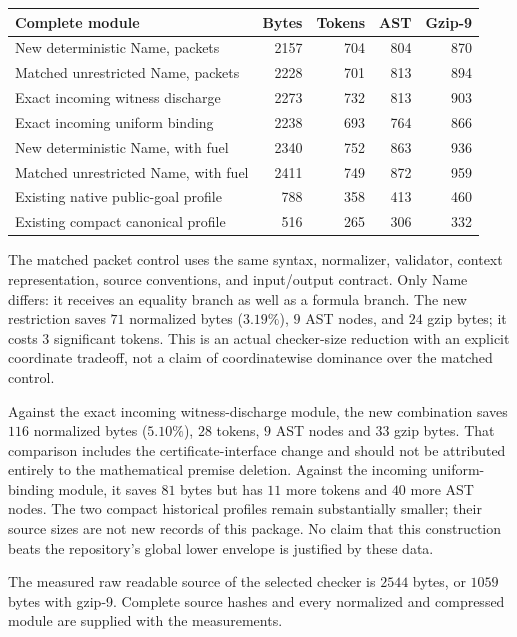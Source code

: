 \documentclass[11pt,a4paper]{article}
\theoremstyle{definition}\newtheorem{definition}[theorem]{Definition}
\theoremstyle{remark}\newtheorem{remark}[theorem]{Remark}
\begin{document}
\begin{center}
\small
\begin{tabular}{@{}lrrrr@{}}
\toprule
Complete module & Bytes & Tokens & AST & Gzip-9 \\
\midrule
New deterministic Name, packets & 2157 & 704 & 804 & 870 \\
Matched unrestricted Name, packets & 2228 & 701 & 813 & 894 \\
Exact incoming witness discharge & 2273 & 732 & 813 & 903 \\
Exact incoming uniform binding & 2238 & 693 & 764 & 866 \\
New deterministic Name, with fuel & 2340 & 752 & 863 & 936 \\
Matched unrestricted Name, with fuel & 2411 & 749 & 872 & 959 \\
\midrule
Existing native public-goal profile & 788 & 358 & 413 & 460 \\
Existing compact canonical profile & 516 & 265 & 306 & 332 \\
\bottomrule
\end{tabular}
\end{center}

The matched packet control uses the same syntax, normalizer, validator,
context representation, source conventions, and input/output contract.
Only Name differs: it receives an equality branch as well as a formula
branch. The new restriction saves $71$ normalized bytes ($3.19\%$),
$9$ AST nodes, and $24$ gzip bytes; it costs $3$ significant tokens.
This is an actual checker-size reduction with an explicit coordinate
tradeoff, not a claim of coordinatewise dominance over the matched control.

Against the exact incoming witness-discharge module, the new combination
saves $116$ normalized bytes ($5.10\%$), $28$ tokens, $9$ AST nodes and
$33$ gzip bytes. That comparison includes the certificate-interface
change and should not be attributed entirely to the mathematical premise
deletion. Against the incoming uniform-binding module, it saves $81$
bytes but has $11$ more tokens and $40$ more AST nodes. The two compact
historical profiles remain substantially smaller; their source sizes
are not new records of this package. No claim that this construction
beats the repository's global lower envelope is justified by these data.

The measured raw readable source of the selected checker is $2544$
bytes, or $1059$ bytes with gzip-9. Complete source hashes and every
normalized and compressed module are supplied with the measurements.
\end{document}
